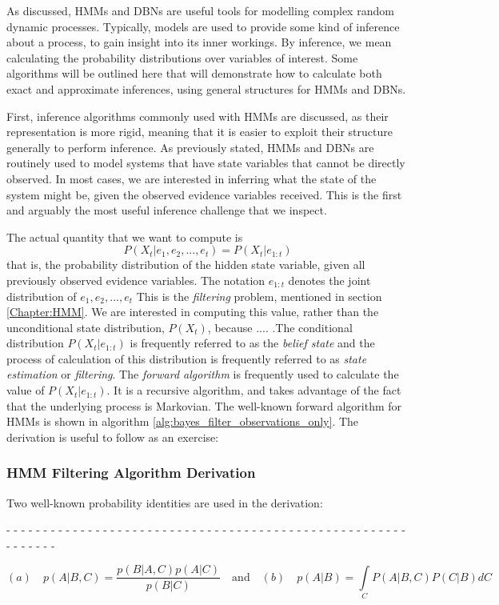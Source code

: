 As discussed, HMMs and DBNs are useful tools for modelling complex random dynamic processes. Typically, models are used to provide some kind of inference about a process, to gain insight into its inner workings. By inference, we mean calculating the probability distributions over variables of interest. Some algorithms will be outlined here that will demonstrate how to calculate both exact and approximate inferences, using general structures for HMMs and DBNs. \par

First, inference algorithms commonly used with HMMs are discussed, as their representation is more rigid, meaning that it is easier to exploit their structure generally to perform inference. As previously stated, HMMs and DBNs are routinely used to model systems that have state variables that cannot be directly observed. In most cases, we are interested in inferring what the state of the system might be, given the observed evidence variables received. This is the first and arguably the most useful inference challenge that we inspect.

The actual quantity that we want to compute is 
\[P(X_t | e_1, e_2, ..., e_t) = P(X_t | e_{1:t})\]
that is, the probability distribution of the hidden state variable, given all previously observed evidence variables. The notation $e_{1:t}$ denotes the joint distribution of $e_1, e_2, ..., e_t$ This is the \textit{filtering} problem, mentioned in section \ref{Chapter:HMM}. We are interested in computing this value, rather than the unconditional state distribution, $P(X_t)$, because .... .The conditional distribution $P(X_t | e_{1:t})$ is frequently referred to as the \textit{belief state} and the process of calculation of this distribution is frequently referred to as \textit{state estimation} or \textit{filtering}. The \textit{forward algorithm} is frequently used to calculate the value of $P(X_t | e_{1:t})$. It is a recursive algorithm, and takes advantage of the fact that the underlying process is Markovian. The well-known forward algorithm for HMMs is shown in algorithm \ref{alg:bayes_filter_observations_only}. The derivation is useful to follow as an exercise:
\subsubsection{HMM Filtering Algorithm Derivation} 
\label{section:HMMFiltering}
Two well-known probability identities are used in the derivation: 
\begin{center}
- - - - - - - - - - - - - - - - - - - - - - - - - - - - - - - - - - - - - - - - - - - - - - - - - - - - - - - - - - - - - 
\end{center}
\[(a) \quad p(A | B, C) = \frac{p(B | A, C) p(A | C)}{p(B | C)} \quad \text{and} \quad (b) \quad p(A | B) = \int\limits_{C}P(A | B, C) P(C | B)dC\]


